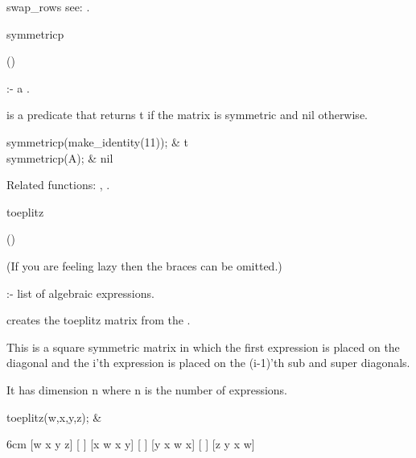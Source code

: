 \begin{Operator}{swap_rows}
see:  .
\end{Operator}


\begin{Operator}{symmetricp}

\begin{Syntax}
()
\end{Syntax}
 
 :- a .

 is a predicate that returns t if the matrix is symmetric 
and nil otherwise.


\begin{Examples}

symmetricp(make_identity(11)); &
t \\
symmetricp(A); &
nil\\

\end{Examples}

Related functions: , .

\end{Operator}


\begin{Operator}{toeplitz}

\begin{Syntax}
() 
\end{Syntax}
(If you are feeling lazy then the braces can be omitted.)

 :- list of algebraic expressions.

 creates the toeplitz matrix from the . 

This is a square symmetric matrix in which the first expression is 
placed on the diagonal and the i'th expression is placed on the (i-1)'th
sub and super diagonals.

It has dimension n where n is the number of expressions.


\begin{Examples}

toeplitz({w,x,y,z}); &
\begin{multilineoutput}{6cm}
[w  x  y  z]
[          ]
[x  w  x  y]
[          ]
[y  x  w  x]
[          ]
[z  y  x  w]
\end{multilineoutput}

\end{Examples}

\end{Operator}


